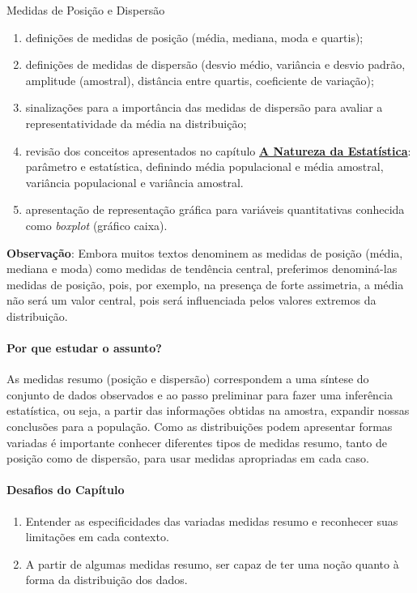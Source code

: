 \begin{apresentacao}{Medidas de Posição e Dispersão}
\begin{enumerate}
\item definições de medidas de posição (média, mediana, moda e quartis);
\item definições de medidas de dispersão (desvio médio, variância e desvio padrão, amplitude (amostral), distância entre quartis, coeficiente de variação);
\item sinalizações para a importância das medidas de dispersão para avaliar a representatividade da média na distribuição;
\item revisão dos conceitos apresentados no capítulo \hyperref[est1-chap]{\textbf{A Natureza da Estatística}}: parâmetro e estatística, definindo média populacional e média amostral, variância populacional e variância amostral.
\item apresentação de representação gráfica para variáveis quantitativas conhecida como \textit{boxplot} (gráfico caixa).
\end{enumerate}

\textbf{Observação}: Embora muitos textos denominem as medidas de posição (média, mediana e moda) como medidas de tendência central, preferimos denominá-las medidas de posição, pois, por exemplo, na presença de forte assimetria, a média não será um valor central, pois será influenciada pelos valores extremos da distribuição.

\paragraph{Por que estudar o assunto?}

As medidas resumo (posição e dispersão) correspondem a uma síntese do conjunto de dados observados e ao passo preliminar para fazer uma inferência estatística, ou seja, a partir das informações obtidas na amostra, expandir nossas conclusões para a população. Como as distribuições podem apresentar formas variadas é importante conhecer diferentes tipos de medidas resumo, tanto de posição como de dispersão, para usar medidas apropriadas em cada caso.

\paragraph{Desafios do Capítulo}

\begin{enumerate}
\item Entender as especificidades das variadas medidas resumo e reconhecer suas limitações em cada contexto.
\item A partir de algumas medidas resumo, ser capaz de ter uma noção quanto à forma da distribuição dos dados.
\end{enumerate}


\end{apresentacao}
